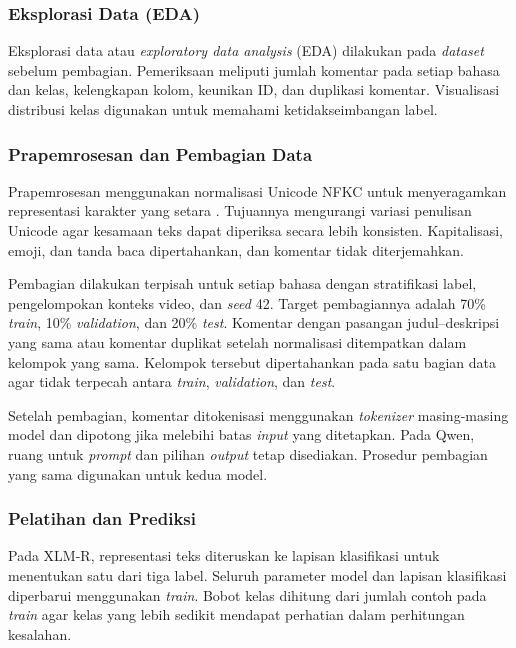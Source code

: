 \documentclass[11pt]{article}
\begin{document}
\subsubsection{Eksplorasi Data (EDA)}
Eksplorasi data atau \textit{exploratory data analysis} (EDA) dilakukan pada \textit{dataset} sebelum pembagian. Pemeriksaan meliputi jumlah komentar pada setiap bahasa dan kelas, kelengkapan kolom, keunikan ID, dan duplikasi komentar. Visualisasi distribusi kelas digunakan untuk memahami ketidakseimbangan label.

\subsubsection{Prapemrosesan dan Pembagian Data}
Prapemrosesan menggunakan normalisasi Unicode NFKC untuk menyeragamkan representasi karakter yang setara \citep{unicode-consortium-2026-normalization}. Tujuannya mengurangi variasi penulisan Unicode agar kesamaan teks dapat diperiksa secara lebih konsisten. Kapitalisasi, emoji, dan tanda baca dipertahankan, dan komentar tidak diterjemahkan.

Pembagian dilakukan terpisah untuk setiap bahasa dengan stratifikasi label, pengelompokan konteks video, dan \textit{seed} 42. Target pembagiannya adalah 70\% \textit{train}, 10\% \textit{validation}, dan 20\% \textit{test}. Komentar dengan pasangan judul--deskripsi yang sama atau komentar duplikat setelah normalisasi ditempatkan dalam kelompok yang sama. Kelompok tersebut dipertahankan pada satu bagian data agar tidak terpecah antara \textit{train}, \textit{validation}, dan \textit{test}.

Setelah pembagian, komentar ditokenisasi menggunakan \textit{tokenizer} masing-masing model dan dipotong jika melebihi batas \textit{input} yang ditetapkan. Pada Qwen, ruang untuk \textit{prompt} dan pilihan \textit{output} tetap disediakan. Prosedur pembagian yang sama digunakan untuk kedua model.

\subsubsection{Pelatihan dan Prediksi}
Pada XLM-R, representasi teks diteruskan ke lapisan klasifikasi untuk menentukan satu dari tiga label. Seluruh parameter model dan lapisan klasifikasi diperbarui menggunakan \textit{train}. Bobot kelas dihitung dari jumlah contoh pada \textit{train} agar kelas yang lebih sedikit mendapat perhatian dalam perhitungan kesalahan.
\end{document}

